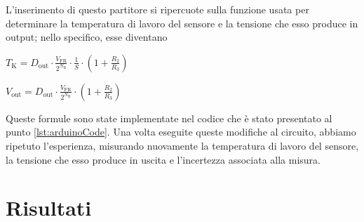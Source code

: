 \documentclass[a4paper]{article}
\begin{document}
			\newline
			L'inserimento di questo partitore si ripercuote sulla funzione usata per determinare la temperatura di lavoro del sensore e la tensione che esso produce in output; nello specifico, esse diventano
			\begin{center}
				$ T_{\mathrm{K}} = D_{\mathrm{out}} \cdot \frac{V_{\mathrm{FR}}}{2^{N_{\mathrm{B}}}} \cdot \frac{1}{S} \cdot (1 + \frac{R_{2}}{R_{3}}) $
			\end{center}
			\begin{center}
				$ V_{\mathrm{out}} = D_{\mathrm{out}} \cdot \frac{V_{\mathrm{FR}}}{2^{N_{\mathrm{B}}}} \cdot (1 + \frac{R_{2}}{R_{3}}) $
			\end{center}
			Queste formule sono state implementate nel codice che è stato presentato al punto \ref{lst:arduinoCode}.
			\newline
			Una volta eseguite queste modifiche al circuito, abbiamo ripetuto l'esperienza, misurando nuovamente la temperatura di lavoro del sensore, la tensione che esso produce in uscita e l'incertezza associata alla misura.
	\section{Risultati}
\end{document}

